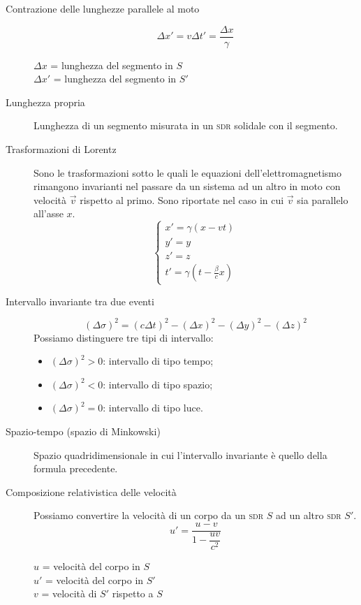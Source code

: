 \documentclass[a4paper,11pt,italian]{article}
\begin{document}
\begin{description}
  \item[Contrazione delle lunghezze parallele al moto] 
  \[ \Delta x' = v \Delta t' = \frac{\Delta x}{\gamma} \]
  \begin{multicols}{2}
  $ \Delta x $ = lunghezza del segmento in $ S $\\
  $ \Delta x' $ = lunghezza del segmento in $ S' $
  \end{multicols}
  
  \item[Lunghezza propria] Lunghezza di un segmento misurata in un \textsc{sdr} solidale con il segmento.
  
  \item[Trasformazioni di Lorentz]
  Sono le trasformazioni sotto le quali le equazioni dell'elettromagnetismo rimangono invarianti nel passare da un sistema ad un altro in moto con velocità $ \vec{v} $ rispetto al primo.
  Sono riportate nel caso in cui $ \vec{v} $ sia parallelo all'asse $ x $.
  \[
  \left\{ 
  \begin{array}{l}
  x' = \gamma (x -vt) \\ 
  y' = y \\ 
  z' = z \\
  t' = \gamma \left(  t - \frac{\beta}{c}x  \right)
  \end{array}
  \right. 
  \]
  \item[Intervallo invariante tra due eventi] 
  \[ (\Delta \sigma)^2 = (c\Delta t)^2 - (\Delta x)^2 - (\Delta y)^2 - (\Delta z)^2 \]
  Possiamo distinguere tre tipi di intervallo:
  \begin{itemize}
    \item $ (\Delta \sigma)^2 > 0 $: intervallo di tipo tempo;
    \item $ (\Delta \sigma)^2 < 0 $: intervallo di tipo spazio;
    \item $ (\Delta \sigma)^2 = 0 $: intervallo di tipo luce.
  \end{itemize}
  
  \item[Spazio-tempo (spazio di Minkowski)]
  Spazio quadridimensionale in cui l'intervallo invariante è quello della formula precedente.
  
  \item[Composizione relativistica delle velocità]
  Possiamo convertire la velocità di un corpo da un \textsc{sdr} $ S $ ad un altro \textsc{sdr} $ S' $.
  \[ u' = \frac{u - v}{1- \dfrac{u v}{c^2}} \]
  \begin{multicols}{2}
  $ u $ = velocità del corpo in $ S $\\
  $ u' $ = velocità del corpo in $ S' $\\
  $ v $ = velocità di $ S' $ rispetto a $ S $
  \end{multicols}
  

\end{description}
\end{document}
